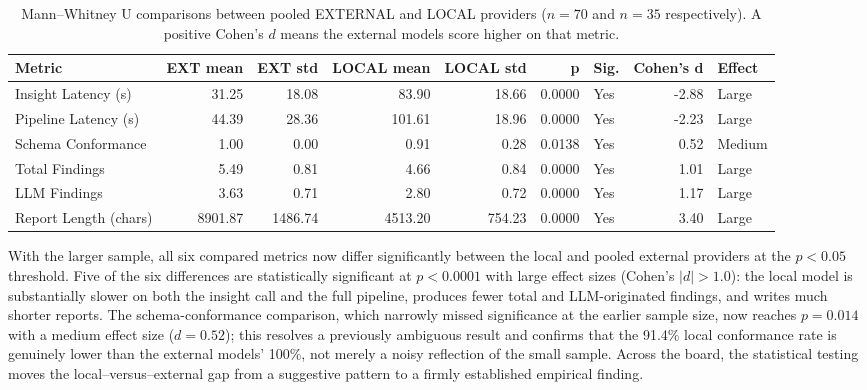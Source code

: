 \documentclass[]{UCD_CS_FYP_Report}
\begin{document}
\begin{table}[!ht]
    \centering
    {\footnotesize
        \begin{tabular}{|l|r|r|r|r|r|l|r|l|}
        \hline
            \textbf{Metric} & \textbf{EXT mean} & \textbf{EXT std} & \textbf{LOCAL mean} & \textbf{LOCAL std} & \textbf{p} & \textbf{Sig.} & \textbf{Cohen's d} & \textbf{Effect} \\ \hline
            Insight Latency (s)   &   31.25 &   18.08 &   83.90 &   18.66 & 0.0000 & Yes & -2.88 & Large  \\ \hline
            Pipeline Latency (s)  &   44.39 &   28.36 &  101.61 &   18.96 & 0.0000 & Yes & -2.23 & Large  \\ \hline
            Schema Conformance    &    1.00 &    0.00 &    0.91 &    0.28 & 0.0138 & Yes &  0.52 & Medium \\ \hline
            Total Findings        &    5.49 &    0.81 &    4.66 &    0.84 & 0.0000 & Yes &  1.01 & Large  \\ \hline
            LLM Findings          &    3.63 &    0.71 &    2.80 &    0.72 & 0.0000 & Yes &  1.17 & Large  \\ \hline
            Report Length (chars) & 8901.87 & 1486.74 & 4513.20 &  754.23 & 0.0000 & Yes &  3.40 & Large  \\ \hline
        \end{tabular}
    }
    \caption{Mann--Whitney U comparisons between pooled EXTERNAL and LOCAL providers ($n = 70$ and $n = 35$ respectively). A positive Cohen's $d$ means the external models score higher on that metric.}
    \label{tab:mann_whitney}
\end{table}
 
With the larger sample, all six compared metrics now differ significantly between the local and pooled external providers at the $p < 0.05$ threshold. Five of the six differences are statistically significant at $p < 0.0001$ with large effect sizes (Cohen's $|d| > 1.0$): the local model is substantially slower on both the insight call and the full pipeline, produces fewer total and LLM-originated findings, and writes much shorter reports. The schema-conformance comparison, which narrowly missed significance at the earlier sample size, now reaches $p = 0.014$ with a medium effect size ($d = 0.52$); this resolves a previously ambiguous result and confirms that the 91.4\% local conformance rate is genuinely lower than the external models' 100\%, not merely a noisy reflection of the small sample. Across the board, the statistical testing moves the local--versus--external gap from a suggestive pattern to a firmly established empirical finding.
 
\end{document}
